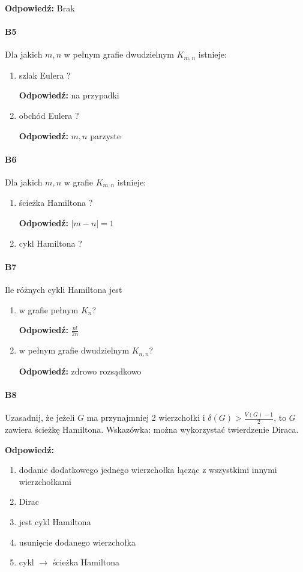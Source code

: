 \documentclass[a4paper,12pt]{article}
\theoremstyle{definition}%
\theoremstyle{definition}
\theoremstyle{problem}
\begin{document}
\textbf{Odpowiedź: }Brak
\paragraph{B5} Dla jakich $m, n$ w pełnym grafie dwudzielnym $K_{m,n}$ istnieje:
\begin{enumerate}[label=\alph*)]
\item szlak Eulera ?

\textbf{Odpowiedź: }na przypadki
\item obchód Eulera ?

\textbf{Odpowiedź: }$m,n$ parzyste
\end{enumerate}

\paragraph{B6} Dla jakich $m, n$ w grafie $K_{m,n}$ istnieje:
\begin{enumerate}[label=\alph*)]
\item ścieżka Hamiltona ?

\textbf{Odpowiedź: }$|m-n|=1$
\item cykl Hamiltona ?
\end{enumerate}


\paragraph{B7} Ile różnych cykli Hamiltona jest
\begin{enumerate}[label=\alph*)]
\item w grafie pełnym $K_n$?

\textbf{Odpowiedź: }$\frac{n!}{2n}$
\item w pełnym grafie dwudzielnym $K_{n,n}$?

\textbf{Odpowiedź: }zdrowo rozsądkowo 
\end{enumerate}

\paragraph{B8} Uzasadnij, że jeżeli $G$ ma przynajmniej 2 wierzchołki i $\delta (G) > \frac{V(G) - 1}{2}$, to $G$ zawiera ścieżkę Hamiltona. Wskazówka: można wykorzystać twierdzenie Diraca.

\textbf{Odpowiedź: }
\begin{enumerate}
\item dodanie dodatkowego jednego wierzchołka łącząc z wszystkimi innymi wierzchołkami
\item Dirac
\item jest cykl Hamiltona
\item usunięcie dodanego wierzchołka
\item cykl $\rightarrow$ ścieżka Hamiltona
\end{enumerate}
\end{document}
